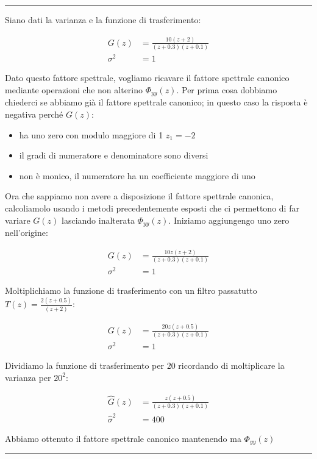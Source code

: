 \begin{center} \rule{300pt}{1pt} \end{center}
\begin{esempio} %
Siano dati la varianza e la funzione di trasferimento:

\begin{align*}
  G(z)&=\frac{10(z+2)}{(z+0.3)(z+0.1)}\\
  \sigma^2&=1  
\end{align*}

Dato questo fattore spettrale, vogliamo ricavare il fattore spettrale canonico mediante operazioni che non alterino $\Phi_{yy}(z)$. Per prima cosa dobbiamo chiederci se abbiamo già il fattore spettrale canonico; in questo caso la risposta è negativa perché $G(z)$:
\begin{itemize}
   \item ha uno zero con modulo maggiore di 1 $z_1=-2$
   \item il gradi di numeratore e denominatore sono diversi
   \item non è monico, il numeratore ha un coefficiente maggiore di uno
 \end{itemize} 
Ora che sappiamo non avere a disposizione il fattore spettrale canonica, calcoliamolo usando i metodi precedentemente esposti che ci permettono di far variare $G(z)$ lasciando inalterata $\Phi_{yy}(z)$. Iniziamo aggiungengo uno zero nell'origine:

\begin{align*}
  G(z)&=\frac{10z(z+2)}{(z+0.3)(z+0.1)}\\
  \sigma^2&=1  
\end{align*}

Moltiplichiamo la funzione di trasferimento con un filtro passatutto $T(z)=\frac{2(z+0.5)}{(z+2)}$:

\begin{align*}
  G(z)&=\frac{20z(z+0.5)}{(z+0.3)(z+0.1)}\\
  \sigma^2&=1  
\end{align*}

Dividiamo la funzione di trasferimento per $20$ ricordando di moltiplicare la varianza per $20^2$:

\begin{align*}
  \hat{G}(z)&=\frac{z(z+0.5)}{(z+0.3)(z+0.1)}\\
  \hat{\sigma}^2&=400  
\end{align*}

Abbiamo ottenuto il fattore spettrale canonico mantenendo ma $\Phi_{yy}(z)$
\end{esempio}
\begin{center} \rule{300pt}{1pt} \end{center}
